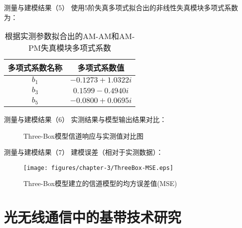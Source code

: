 \documentclass[mathserif, utf8, 9pt]{beamer}
\begin{document}
\begin{frame}{测量与建模结果（5）}
    使用5阶失真多项式拟合出的非线性失真模块多项式系数为：
    \begin{table}[htbp]
        \caption{根据实测参数拟合出的AM-AM和AM-PM失真模块多项式系数}
        \centering
        \begin{tabular}{cc}
            \toprule
            多项式系数名称 & 多项式系数值\\
            \midrule
            $b_1$ & $-0.1273 + 1.0322i$\\
            $b_3$ & $0.1599 - 0.4940i$\\
            $b_5$ & $-0.0800 + 0.0695i$\\
            \bottomrule
        \end{tabular}
    \end{table}
\end{frame}

\begin{frame}{测量与建模结果（6）}
    实测结果与模型输出结果对比：
    \begin{figure}[htbp]
        \centering
        \caption{Three-Box模型信道响应与实测值对比图}
    \end{figure}
\end{frame}

\begin{frame}{测量与建模结果（7）}
    建模误差（相对于实测数据）：
    \begin{figure}[htbp]
        \centering
    	\texttt{[image: figures/chapter-3/ThreeBox-MSE.eps]}
    	\caption{Three-Box模型建立的信道模型的均方误差值(MSE)}
    	\label{fig:ThreeBoxVSMeasurementMSE}
    \end{figure}
\end{frame}

\section{光无线通信中的基带技术研究}
\end{document}
